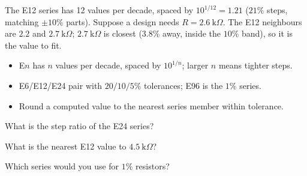 \begin{workedexample}
The E12 series has 12 values per decade, spaced by $10^{1/12} = 1.21$
($21\%$ steps, matching $\pm10\%$ parts). Suppose a design needs
$R = 2.6\ \text{k}\Omega$. The E12 neighbours are $2.2$ and $2.7\ \text{k}\Omega$;
$2.7\ \text{k}\Omega$ is closest ($3.8\%$ away, inside the $10\%$ band), so it is
the value to fit.
\end{workedexample}

\begin{keytakeaways}
\begin{itemize}[leftmargin=1.4em,itemsep=2pt]
\item E$n$ has $n$ values per decade, spaced by $10^{1/n}$; larger $n$ means tighter steps.
\item E6/E12/E24 pair with $20/10/5\%$ tolerances; E96 is the $1\%$ series.
\item Round a computed value to the nearest series member within tolerance.
\end{itemize}
\end{keytakeaways}

\begin{exercises}
\item What is the step ratio of the E24 series?
\item What is the nearest E12 value to $4.5\ \text{k}\Omega$?
\item Which series would you use for $1\%$ resistors?
\end{exercises}

